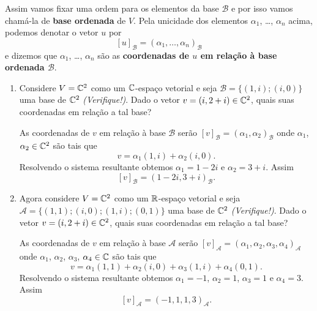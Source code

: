 Assim vamos fixar uma ordem para os elementos da base $\mathcal{B}$ e por isso vamos chamá-la de \textbf{base ordenada} de $V$. Pela unicidade dos elementos $\alpha_1$, \dots, $\alpha_n$ acima, podemos denotar o vetor $u$ por
\[
	[u]_\mathcal{B} = (\alpha_1,\dots,\alpha_n)_\mathcal{B}
\]
e dizemos que $\alpha_1$, \dots, $\alpha_n$ são as \textbf{coordenadas de $u$ em relação à base ordenada $\mathcal{B}$}.

\begin{exemplos}
	\begin{enumerate}
		\item Considere $V = \mathbb{C}^2$ como um $\mathbb{C}$-espaço vetorial e seja $\mathcal{B} = \{(1,i);(i,0)\}$ uma base de $\mathbb{C}^2$ \textit{(Verifique!)}. Dado o vetor $v = (i, 2+i) \in \mathbb{C}^2$, quais suas coordenadas em relação a tal base?
		\begin{solucao}
			As coordenadas de $v$ em relação à base $\mathcal{B}$ serão $[v]_\mathcal{B} = (\alpha_1,\alpha_2)_\mathcal{B}$ onde $\alpha_1$, $\alpha_2 \in \mathbb{C}^2$ são tais que
			\[
				v = \alpha_1(1,i) + \alpha_2(i,0).
			\]
			Resolvendo o sistema resultante obtemos $\alpha_1 = 1 - 2i$ e $\alpha_2 = 3 + i$. Assim
			\[
				[v]_\mathcal{B} = (1 - 2i, 3 + i)_\mathcal{B}.
			\]
		\end{solucao}

		\item Agora considere $V = \mathbb{C}^2$ como um $\mathbb{R}$-espaço vetorial e seja $\mathcal{A} = \{(1,1);(i,0);(1,i);(0,1)\}$ uma base de $\mathbb{C}^2$ \textit{(Verifique!)}. Dado o vetor $v = (i,2+i) \in \mathbb{C}^2$, quais suas coordenadas em relação a tal base?
		\begin{solucao}
			As coordenadas de $v$ em relação à base $\mathcal{A}$ serão $[v]_\mathcal{A} = (\alpha_1,\alpha_2,\alpha_3,\alpha_4)_\mathcal{A}$ onde $\alpha_1$, $\alpha_2$, $\alpha_3$, $\alpha_4 \in \mathbb{C}$ são tais que
			\[
				v = \alpha_1(1,1) + \alpha_2(i,0) + \alpha_3(1,i) + \alpha_4(0,1).
			\]
			Resolvendo o sistema resultante obtemos $\alpha_1 = -1$, $\alpha_2 = 1$, $\alpha_3 = 1$ e $\alpha_4 = 3$. Assim
			\[
				[v]_\mathcal{A} = (-1,1,1,3)_\mathcal{A}.
			\]
		\end{solucao}
	\end{enumerate}
\end{exemplos}

